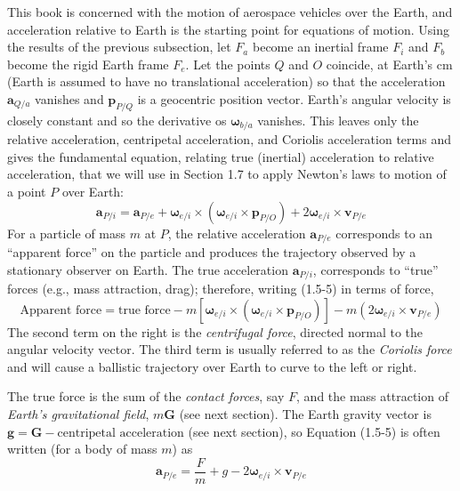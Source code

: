 This book is concerned with the motion of aerospace vehicles over the Earth, and acceleration relative to Earth is the starting point for equations of motion. Using the results of the previous subsection, let \(F_{a}\) become an inertial frame \(F_{i}\) and \(F_{b}\) become the rigid Earth frame \(F_{e}\). Let the points \(Q\) and \(O\) coincide, at Earth's cm (Earth is assumed to have no translational acceleration) so that the acceleration \(\mathbf{a}_{Q/a}\) vanishes and \(\mathbf{p}_{P/Q}\) is a geocentric position vector. Earth's angular velocity is closely constant and so the derivative os \(\mathbf{\omega}_{b/a}\) vanishes. This leaves only the relative acceleration, centripetal acceleration, and Coriolis acceleration terms and gives the fundamental equation, relating true (inertial) acceleration to relative acceleration, that we will use in Section 1.7 to apply Newton's laws to motion of a point \(P\) over Earth:
\begin{equation*} \tag{1.5-5}
    {\mathbf{a}_{P/i}} = {\mathbf{a}_{P/e}} + {\mathbf{\omega}_{e/i}}\!\times\!\left({\mathbf{\omega}_{e/i}}\!\times\!{\mathbf{p}_{P/O}}\right) + 2\mathbf{\omega}_{e/i}\!\times\!\mathbf{v}_{P/e}
\end{equation*}
For a particle of mass \(m\) at \(P\), the relative acceleration \(\mathbf{a}_{P/e}\) corresponds to an ``apparent force'' on the particle and produces the trajectory observed by a stationary observer on Earth. The true acceleration \(\mathbf{a}_{P/i}\), corresponds to ``true'' forces (e.g., mass attraction,  drag); therefore, writing (1.5-5) in terms of force,
\begin{equation*}
    \text{Apparent force} = \text{true force} - m \left[{\mathbf{\omega}_{e/i}}\!\times\!\left({\mathbf{\omega}_{e/i}}\!\times\!{\mathbf{p}_{P/O}}\right)\right] - m \left( 2{\mathbf{\omega}_{e/i}}\!\times\!{\mathbf{v}_{P/e}}\right)
\end{equation*}
The second term on the right is the \textit{centrifugal force}, directed normal to the angular velocity vector. The third term is usually referred to as the \textit{Coriolis force} and will cause a ballistic trajectory over Earth to curve to the left or right.

The true force is the sum of the \textit{contact forces}, say \(F\), and the mass attraction of \textit{Earth's gravitational field}, \(m\mathbf{G}\) (see next section). The Earth gravity vector is \(\mathbf{g} = \mathbf{G} - \text{centripetal acceleration}\) (see next section), so Equation (1.5-5) is often written (for a body of mass \(m\)) as
\begin{equation*} \tag{1.5-6}
    \mathbf{a}_{P/e} = \frac{F}{m} + g - {2 \mathbf{\omega}_{e/i}}\!\times\!{\mathbf{v}_{P/e}}
\end{equation*}

